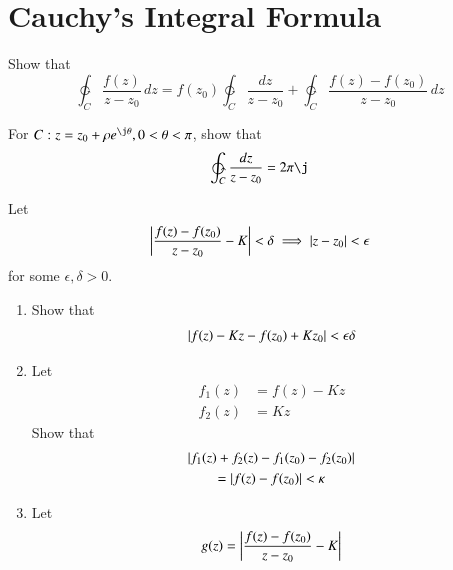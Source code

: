 \documentclass[journal,12pt,twocolumn]{IEEEtran}
\begin{document}
\section{Cauchy's Integral Formula}
\begin{problem}
Show that
\begin{equation}
\ointctrclockwise_C \frac{f(z)}{z-z_0}\,dz =  f(z_0)\ointctrclockwise_C \frac{dz}{z-z_0} + \ointctrclockwise_C \frac{f(z)-f(z_0)}{z-z_0}\,dz
\end{equation}
\end{problem}
\begin{problem}
For $C:z = z_0+\rho e^{\j\theta}, 0 < \theta < \pi$, show that
\begin{equation}
\ointctrclockwise_C \frac{dz}{z-z_0} = 2\pi \j
\end{equation}
\end{problem}
%
\begin{problem}
Let
\begin{equation}
\left\vert\frac{f(z)-f(z_0)}{z-z_0} - K\right\vert < \delta \implies \left\vert z-z_0\right\vert < \epsilon
\end{equation}
for some $\epsilon, \delta > 0$.  
\begin{enumerate}
\item
Show that 
\begin{equation}
\left\vert f(z)-Kz -f(z_0)+Kz_0\right\vert < \epsilon\delta
\end{equation}
\item Let
\begin{align}
f_1(z) &=  f(z)-Kz
\\
f_2(z) &= Kz 
\end{align}
Show that 
\begin{multline}
\left\vert f_1(z)+f_2(z)-f_1(z_0)-f_2(z_0)\right\vert 
\\
= \left\vert f(z)-f(z_0)\right\vert < \kappa 
\end{multline}
\item Let
\begin{equation}
g(z)=\left\vert\frac{f(z)-f(z_0)}{z-z_0} - K\right\vert
\end{equation}
\end{enumerate}
\end{problem}
\end{document}
